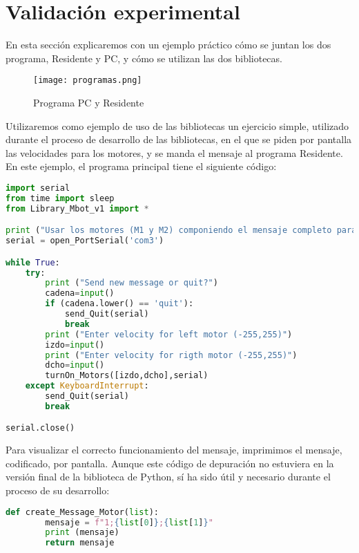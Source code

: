 \section{Validación experimental}\label{sec:resultado}
En esta sección explicaremos con un ejemplo práctico cómo se juntan los dos programa, Residente y PC, y cómo se utilizan las dos bibliotecas. \\

\begin{figure}[h]
	\centering
	\texttt{[image: programas.png]}
	\label{img:Mix}
	\caption{Programa PC y Residente}
\end{figure} 
\vspace{1cm}
Utilizaremos como ejemplo de uso de las bibliotecas un ejercicio simple, utilizado durante el proceso de desarrollo de las bibliotecas, en el que se piden por pantalla las velocidades para los motores, y se manda el mensaje al programa Residente.\\
En este ejemplo, el programa principal tiene el siguiente código:
\begin{lstlisting}[language=python,caption={Ejemplo de uso de PyBoKids 2.0},captionpos=b]
import serial
from time import sleep
from Library_Mbot_v1 import *

print ("Usar los motores (M1 y M2) componiendo el mensaje completo para mandar exactamente los valores")
serial = open_PortSerial('com3')

while True:
	try:
		print ("Send new message or quit?")
		cadena=input()
		if (cadena.lower() == 'quit'):
			send_Quit(serial)
			break
		print ("Enter velocity for left motor (-255,255)")
		izdo=input()
		print ("Enter velocity for rigth motor (-255,255)")
		dcho=input()
		turnOn_Motors([izdo,dcho],serial)
	except KeyboardInterrupt:
		send_Quit(serial)
		break

serial.close()
\end{lstlisting}

Para visualizar el correcto funcionamiento del mensaje, imprimimos el mensaje, codificado, por pantalla. Aunque este código de depuración no estuviera en la versión final de la biblioteca de Python, sí ha sido útil y necesario durante el proceso de su desarrollo:

\begin{lstlisting}[language=python,caption={Uso de la bibliotca durante su desarrollo, con depuración de código},captionpos=b]
	def create_Message_Motor(list):
		mensaje = f"1;{list[0]};{list[1]}"
		print (mensaje)
		return mensaje
\end{lstlisting}

